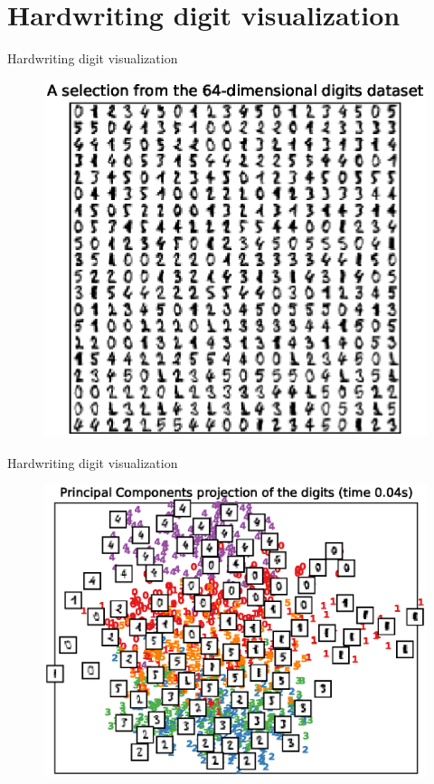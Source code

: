 \documentclass[10pt]{beamer}
\begin{document}
\section{Hardwriting digit visualization}
\begin{frame}{Hardwriting digit visualization}
\begin{figure}
\centering
\includegraphics[scale=0.65]{./image/experiment/example.eps}
\end{figure}
\end{frame}


\begin{frame}{Hardwriting digit visualization}
\begin{figure}
\centering
\includegraphics[scale=0.65]{./image/experiment/pca.eps}
\end{figure}
\end{frame}
\end{document}
